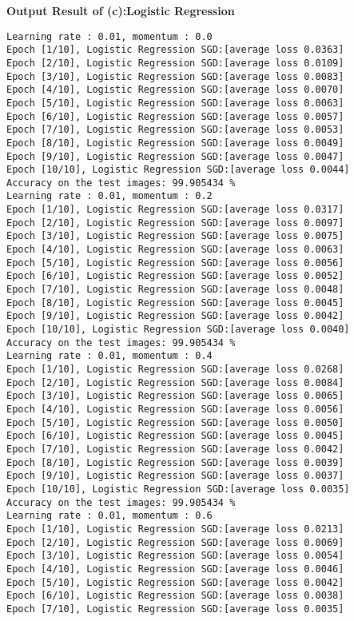 \documentclass[10pt]{article}
\newcommand{\0}{{\mathbf{0}}}
\newcommand{\1}{{\mathbf{1}}}
\begin{document}
\newpage
\textbf{Output Result of (c):Logistic Regression}
\begin{verbatim}
Learning rate : 0.01, momentum : 0.0
Epoch [1/10], Logistic Regression SGD:[average loss 0.0363]
Epoch [2/10], Logistic Regression SGD:[average loss 0.0109]
Epoch [3/10], Logistic Regression SGD:[average loss 0.0083]
Epoch [4/10], Logistic Regression SGD:[average loss 0.0070]
Epoch [5/10], Logistic Regression SGD:[average loss 0.0063]
Epoch [6/10], Logistic Regression SGD:[average loss 0.0057]
Epoch [7/10], Logistic Regression SGD:[average loss 0.0053]
Epoch [8/10], Logistic Regression SGD:[average loss 0.0049]
Epoch [9/10], Logistic Regression SGD:[average loss 0.0047]
Epoch [10/10], Logistic Regression SGD:[average loss 0.0044]
Accuracy on the test images: 99.905434 %
Learning rate : 0.01, momentum : 0.2
Epoch [1/10], Logistic Regression SGD:[average loss 0.0317]
Epoch [2/10], Logistic Regression SGD:[average loss 0.0097]
Epoch [3/10], Logistic Regression SGD:[average loss 0.0075]
Epoch [4/10], Logistic Regression SGD:[average loss 0.0063]
Epoch [5/10], Logistic Regression SGD:[average loss 0.0056]
Epoch [6/10], Logistic Regression SGD:[average loss 0.0052]
Epoch [7/10], Logistic Regression SGD:[average loss 0.0048]
Epoch [8/10], Logistic Regression SGD:[average loss 0.0045]
Epoch [9/10], Logistic Regression SGD:[average loss 0.0042]
Epoch [10/10], Logistic Regression SGD:[average loss 0.0040]
Accuracy on the test images: 99.905434 %
Learning rate : 0.01, momentum : 0.4
Epoch [1/10], Logistic Regression SGD:[average loss 0.0268]
Epoch [2/10], Logistic Regression SGD:[average loss 0.0084]
Epoch [3/10], Logistic Regression SGD:[average loss 0.0065]
Epoch [4/10], Logistic Regression SGD:[average loss 0.0056]
Epoch [5/10], Logistic Regression SGD:[average loss 0.0050]
Epoch [6/10], Logistic Regression SGD:[average loss 0.0045]
Epoch [7/10], Logistic Regression SGD:[average loss 0.0042]
Epoch [8/10], Logistic Regression SGD:[average loss 0.0039]
Epoch [9/10], Logistic Regression SGD:[average loss 0.0037]
Epoch [10/10], Logistic Regression SGD:[average loss 0.0035]
Accuracy on the test images: 99.905434 %
Learning rate : 0.01, momentum : 0.6
Epoch [1/10], Logistic Regression SGD:[average loss 0.0213]
Epoch [2/10], Logistic Regression SGD:[average loss 0.0069]
Epoch [3/10], Logistic Regression SGD:[average loss 0.0054]
Epoch [4/10], Logistic Regression SGD:[average loss 0.0046]
Epoch [5/10], Logistic Regression SGD:[average loss 0.0042]
Epoch [6/10], Logistic Regression SGD:[average loss 0.0038]
Epoch [7/10], Logistic Regression SGD:[average loss 0.0035]

\end{verbatim}
\end{document}
